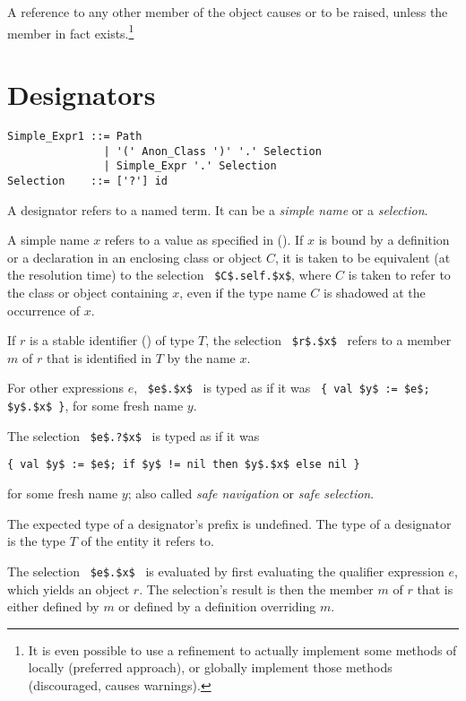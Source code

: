 A reference to any other member of the  object causes  or  to be raised, unless the member in fact exists.\footnote{It is even possible to use a refinement to actually implement some methods of  locally (preferred approach), or globally implement those methods (discouraged, causes warnings).} 






\section{Designators}
\label{sec:designators}

\syntax\begin{lstlisting}
Simple_Expr1 ::= Path
               | '(' Anon_Class ')' '.' Selection
               | Simple_Expr '.' Selection
Selection    ::= ['?'] id
\end{lstlisting}

A designator refers to a named term. It can be a {\em simple name} or a {\em selection}.

A simple name $x$ refers to a value as specified in (). If $x$ is bound by a definition or a declaration in an enclosing class or object $C$, it is taken to be equivalent (at the resolution time) to the selection ~\lstinline!$C$.self.$x$!, where $C$ is taken to refer to the class or object containing $x$, even if the type name $C$ is shadowed at the occurrence of $x$. 

If $r$ is a stable identifier () of type $T$, the selection ~\lstinline!$r$.$x$!~ refers to a member $m$ of $r$ that is identified in $T$ by the name $x$. 

For other expressions $e$, ~\lstinline!$e$.$x$!~ is typed as if it was ~\lstinline!{ val $y$ := $e$; $y$.$x$ }!, for some fresh name $y$. 

The selection ~\lstinline!$e$.?$x$!~ is typed as if it was 
\begin{lstlisting}
{ val $y$ := $e$; if $y$ != nil then $y$.$x$ else nil }
\end{lstlisting}
for some fresh name $y$; also called {\em safe navigation} or {\em safe selection}. 

The expected type of a designator's prefix is undefined. The type of a designator is the type $T$ of the entity it refers to. 

The selection ~\lstinline!$e$.$x$!~ is evaluated by first evaluating the qualifier expression $e$, which yields an object $r$. The selection's result is then the member $m$ of $r$ that is either defined by $m$ or defined by a definition overriding $m$. 







